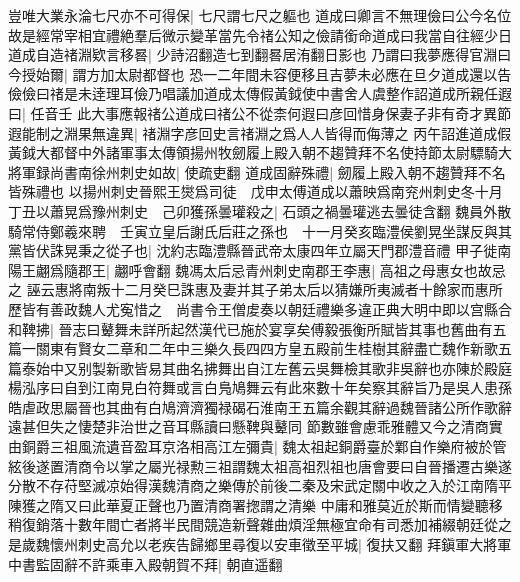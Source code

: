 豈唯大業永淪七尺亦不可得保|{
	七尺謂七尺之軀也}
道成曰卿言不無理儉曰公今名位故是經常宰相宜禮絶羣后微示變革當先令禇公知之儉請銜命道成曰我當自往經少日道成自造禇淵欵言移晷|{
	少詩沼翻造七到翻晷居洧翻日影也}
乃謂曰我夢應得官淵曰今授始爾|{
	謂方加太尉都督也}
恐一二年間未容便移且吉夢未必應在旦夕道成還以告儉儉曰禇是未逹理耳儉乃唱議加道成太傳假黃鉞使中書舍人虞整作詔道成所親任遐曰|{
	任音壬}
此大事應報禇公道成曰禇公不從柰何遐曰彦回惜身保妻子非有奇才異節遐能制之淵果無違異|{
	禇淵字彦回史言禇淵之爲人人皆得而侮薄之}
丙午詔進道成假黃鉞大都督中外諸軍事太傳領揚州牧劒履上殿入朝不趨贊拜不名使持節太尉驃騎大將軍録尚書南徐州刺史如故|{
	使疏吏翻}
道成固辭殊禮|{
	劒履上殿入朝不趨贊拜不名皆殊禮也}
以揚州刺史晉熙王爕爲司徒　戊申太傅道成以蕭映爲南兖州刺史冬十月丁丑以蕭晃爲豫州刺史　己卯獲孫曇瓘殺之|{
	石頭之禍曇瓘逃去曇徒含翻}
魏員外散騎常侍鄭羲來聘　壬寅立皇后謝氏后莊之孫也　十一月癸亥臨澧侯劉晃坐謀反與其黨皆伏誅晃秉之從子也|{
	沈約志臨澧縣晉武帝太康四年立屬天門郡澧音禮}
甲子徙南陽王翽爲隨郡王|{
	翽呼會翻}
魏馮太后忌青州刺史南郡王李惠|{
	高祖之母惠女也故忌之}
誣云惠將南叛十二月癸巳誅惠及妻并其子弟太后以猜嫌所夷滅者十餘家而惠所歷皆有善政魏人尤寃惜之　尚書令王僧䖍奏以朝廷禮樂多違正典大明中即以宫縣合和鞞拂|{
	晉志曰鼙舞未詳所起然漢代已施於宴享矣傅毅張衡所賦皆其事也舊曲有五篇一關東有賢女二章和二年中三樂久長四四方皇五殿前生桂樹其辭盡亡魏作新歌五篇泰始中又别製新歌皆易其曲名拂舞出自江左舊云吳舞檢其歌非吳辭也亦陳於殿庭楊泓序曰自到江南見白符舞或言白鳬鳩舞云有此來數十年矣察其辭旨乃是吳人患孫皓虐政思屬晉也其曲有白鳩濟濟獨禄碣石淮南王五篇余觀其辭過魏晉諸公所作歌辭遠甚但失之悽楚非治世之音耳縣讀曰懸鞞與鼙同}
節數雖會慮乖雅體又今之清商實由銅爵三祖風流遺音盈耳京洛相高江左彌貴|{
	魏太祖起銅爵臺於鄴自作樂府被於管絃後遂置清商令以掌之屬光禄勲三祖謂魏太祖高祖烈祖也唐會要曰自晉播遷古樂遂分散不存苻堅滅凉始得漢魏清商之樂傳於前後二秦及宋武定關中收之入於江南隋平陳獲之隋又曰此華夏正聲也乃置清商署揔謂之清樂}
中庸和雅莫近於斯而情變聽移稍復銷落十數年間亡者將半民間競造新聲雜曲煩淫無極宜命有司悉加補綴朝廷從之　是歲魏懷州刺史高允以老疾告歸鄉里尋復以安車徵至平城|{
	復扶又翻}
拜鎭軍大將軍中書監固辭不許乘車入殿朝賀不拜|{
	朝直遥翻}


